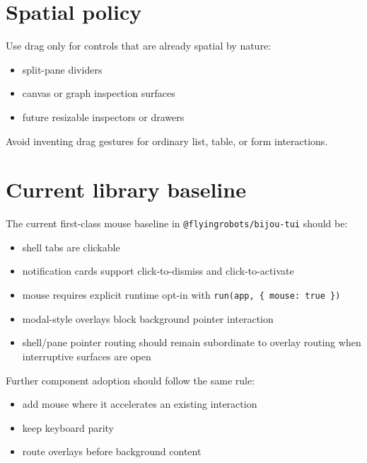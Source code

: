 \section{Spatial policy}\label{record-024-spatial-policy}

Use drag only for controls that are already spatial by nature:

\begin{itemize}
\tightlist
\item
  split-pane dividers
\item
  canvas or graph inspection surfaces
\item
  future resizable inspectors or drawers
\end{itemize}

Avoid inventing drag gestures for ordinary list, table, or form interactions.

\section{Current library baseline}\label{record-024-current-library-baseline}

The current first-class mouse baseline in \texttt{@\allowbreak{}f\allowbreak{}l\allowbreak{}y\allowbreak{}i\allowbreak{}n\allowbreak{}g\allowbreak{}r\allowbreak{}o\allowbreak{}b\allowbreak{}o\allowbreak{}t\allowbreak{}s\allowbreak{}/\allowbreak{}b\allowbreak{}i\allowbreak{}j\allowbreak{}o\allowbreak{}u\allowbreak{}-\allowbreak{}t\allowbreak{}u\allowbreak{}i} should be:

\begin{itemize}
\tightlist
\item
  shell tabs are clickable
\item
  notification cards support click-to-dismiss and click-to-activate
\item
  mouse requires explicit runtime opt-in with \texttt{r\allowbreak{}u\allowbreak{}n\allowbreak{}(\allowbreak{}a\allowbreak{}p\allowbreak{}p\allowbreak{},\allowbreak{} \allowbreak{}\{\allowbreak{} \allowbreak{}m\allowbreak{}o\allowbreak{}u\allowbreak{}s\allowbreak{}e\allowbreak{}:\allowbreak{} \allowbreak{}t\allowbreak{}r\allowbreak{}u\allowbreak{}e\allowbreak{} \allowbreak{}\}\allowbreak{})}
\item
  modal-style overlays block background pointer interaction
\item
  shell/pane pointer routing should remain subordinate to overlay routing when interruptive surfaces are open
\end{itemize}

Further component adoption should follow the same rule:

\begin{itemize}
\tightlist
\item
  add mouse where it accelerates an existing interaction
\item
  keep keyboard parity
\item
  route overlays before background content
\end{itemize}


